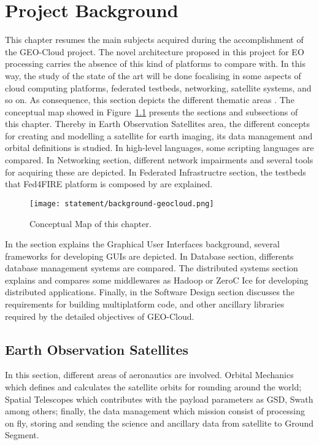 \chapter{Project Background}
\label{chap:antecedentes}


This chapter resumes the main subjects acquired during the accomplishment of the GEO-Cloud project.  The novel architecture proposed in this project for EO processing carries the absence of this kind of platforms to compare with. In this way, the study of the state of the art will be done focalising in some aspects of cloud computing platforms, federated testbeds, networking, satellite systems, and so on. As consequence, this section depicts the different thematic areas .
The conceptual map showed in Figure~\ref{fig:intr-conceptual-map} presents the sections and subsections of this chapter. Thereby in Earth Observation Satellites area, the different concepts for creating and modelling a satellite for earth imaging, its data management and orbital definitions is studied. In high-level languages, some scripting languages are compared. In Networking section, different network impairments and several tools for acquiring these are depicted. In Federated Infrastructre section, the testbeds that Fed4FIRE platform is composed by are explained.

\begin{figure}[!h]
\begin{center}
\texttt{[image: statement/background-geocloud.png]}
\caption{Conceptual Map of this chapter.}
\label{fig:intr-conceptual-map}
\end{center}
\end{figure}

In the section explains the Graphical User Interfaces background, several
frameworks for developing GUIs are depicted. In Database section, differents
database management systems are compared. The distributed systems section
explains and compares some middlewares as Hadoop or ZeroC Ice for developing
distributed applications.
Finally, in the Software Design section discusses the requirements for building multiplatform code, and other ancillary libraries required by the detailed objectives of GEO-Cloud.

\section{Earth Observation Satellites}

In this section, different areas of aeronautics are involved. Orbital
Mechanics which defines and calculates the satellite orbits for rounding around
the world;  Spatial Telescopes which contributes with the payload parameters as
GSD, Swath among others; finally, the data management which mission consist of processing on fly, storing
and sending the science and ancillary data from satellite to Ground Segment.

